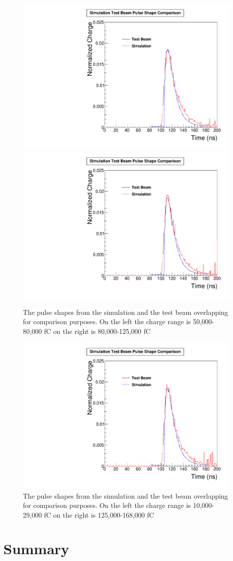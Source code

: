 \begin{figure}
\centering
\includegraphics[width=0.495\linewidth]{Figures/50Comparison.pdf}
\includegraphics[width=0.495\linewidth]{Figures/80Comparison.pdf}
\caption{The pulse shapes from the simulation and the test beam overlapping for comparison purposes. On the left the charge range is 50,000-80,000 fC on the right is 80,000-125,000 fC}
\label{fig:2comparison_together}
\end{figure}

\begin{figure}
\centering
\includegraphics[width=0.495\linewidth]{Figures/125Comparison.pdf}
\caption{The pulse shapes from the simulation and the test beam overlapping for comparison purposes. On the left the charge range is 10,000-29,000 fC on the right is 125,000-168,000 fC}
\label{fig:3comparison_together}
\end{figure}

\section{Summary}

